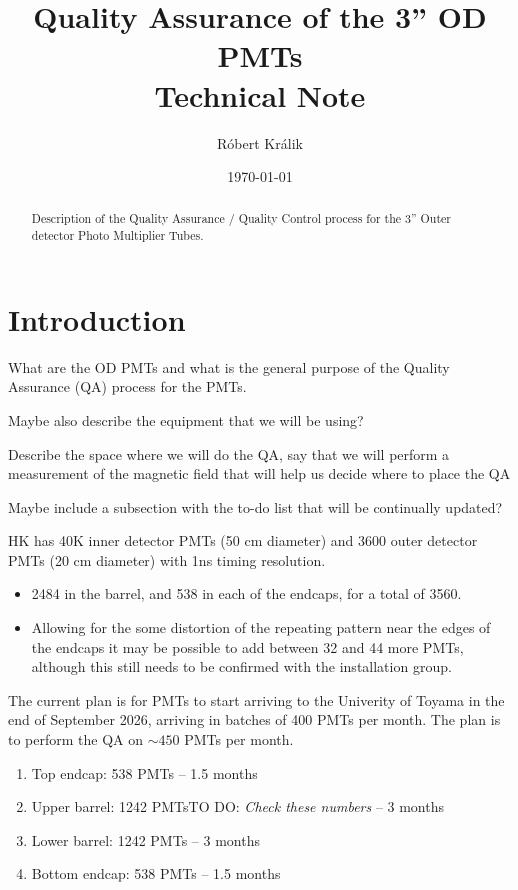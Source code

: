 \documentclass[12pt,a4paper]{article}
\author[1]{Róbert Králik}
\affil[1]{King's College London, UK}
\title{\textbf{Quality Assurance of the 3'' OD PMTs\\ \vspace*{5mm}
\Large{Technical Note}}}
\date{\today}
\newcommand{\todo}[1]{\textcolor{red!90!black}{TO DO: \textit{#1}}}
\begin{document}
\maketitle
\thispagestyle{empty} %
\begin{abstract}
Description of the Quality Assurance / Quality Control process for the 3'' Outer detector Photo Multiplier Tubes.
\end{abstract}
\newpage

\thispagestyle{empty} %
\tableofcontents
\newpage
{} %

\section{Introduction}

What are the OD PMTs and what is the general purpose of the Quality Assurance (QA) process for the PMTs.

Maybe also describe the equipment that we will be using?

Describe the space where we will do the QA, say that we will perform a measurement of the magnetic field that will help us decide where to place the QA

Maybe include a subsection with the to-do list that will be continually updated?

HK has 40K inner detector PMTs (50 cm diameter) and 3600 outer detector PMTs (20 cm diameter) with 1ns timing resolution.
\begin{itemize}
  \item 2484 in the barrel, and 538 in each of the endcaps, for a total of 3560.
  \item Allowing for the some distortion of the repeating pattern near the edges of the endcaps it may be possible to add between 32 and 44 more PMTs, although this still needs to be confirmed with the installation group. 
\end{itemize}

The current plan is for PMTs to start arriving to the Univerity of Toyama in the end of September 2026, arriving in batches of 400 PMTs per month. The plan is to perform the QA on $\sim 450$ PMTs per month.
\begin{enumerate}
  \item Top endcap: 538 PMTs -- 1.5 months
  \item Upper barrel: 1242 PMTs\todo{Check these numbers} -- 3 months
  \item Lower barrel: 1242 PMTs -- 3 months
  \item Bottom endcap: 538 PMTs -- 1.5 months
\end{enumerate}
\end{document}
